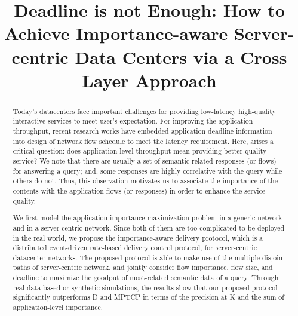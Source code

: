 \documentclass[conference]{IEEEtran}
\begin{document}
\title{Deadline is not Enough: How to Achieve Importance-aware Server-centric Data Centers via a Cross Layer Approach}

\author{
}














\maketitle


\begin{abstract}
Today's datacenters face important challenges for providing low-latency high-quality interactive services to meet user's expectation.
For improving the application throughput, recent research works have embedded application deadline information into design of network flow schedule to meet the latency requirement. Here, arises a critical question: does application-level throughput mean providing better quality service?
We note that there are usually a set of semantic related responses (or flows) for answering a query; and, some responses are highly correlative with the query while others do not.
Thus, this observation motivates us to associate the importance of the contents with the application flows (or responses) in order to enhance the service quality.

We first model the application importance maximization problem in a generic network and in a server-centric network. Since both of them are too complicated to be deployed in the real world, we propose the importance-aware delivery protocol, which is a distributed event-driven rate-based delivery control protocol, for server-centric datacenter networks. The proposed protocol is able to make use of the multiple disjoin paths of server-centric network, and jointly consider flow importance, flow size, and deadline to maximize the goodput of most-related semantic data of a query. Through real-data-based or synthetic simulations, the results show that our proposed protocol significantly outperforms D and MPTCP in terms of the precision at K and the sum of application-level importance.
\end{abstract}
\end{document}
